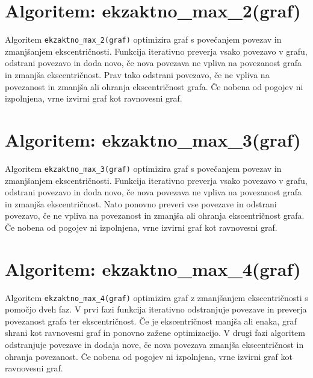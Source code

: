 \documentclass[fin1, tisk]{fmfdelo}
\begin{document}
\section{Algoritem: ekzaktno\_max\_2(graf)}

Algoritem \texttt{ekzaktno\_max\_2(graf)} optimizira graf s povečanjem povezav in zmanjšanjem ekscentričnosti.
Funkcija iterativno preverja vsako povezavo v grafu, odstrani povezavo in doda novo, če nova povezava ne vpliva
na povezanost grafa in zmanjša ekscentričnost. Prav tako odstrani povezavo, če ne vpliva na povezanost in zmanjša
ali ohranja ekscentričnost grafa. Če nobena od pogojev ni izpolnjena, vrne izvirni graf kot ravnovesni graf.

\section{Algoritem: ekzaktno\_max\_3(graf)}

Algoritem \texttt{ekzaktno\_max\_3(graf)} optimizira graf s povečanjem povezav in zmanjšanjem ekscentričnosti.
Funkcija iterativno preverja vsako povezavo v grafu, odstrani povezavo in doda novo, če nova povezava ne vpliva
na povezanost grafa in zmanjša ekscentričnost. Nato ponovno preveri vse povezave in odstrani povezavo,
če ne vpliva na povezanost in zmanjša ali ohranja ekscentričnost grafa. Če nobena od pogojev ni izpolnjena,
vrne izvirni graf kot ravnovesni graf.

\section{Algoritem: ekzaktno\_max\_4(graf)}

Algoritem \texttt{ekzaktno\_max\_4(graf)} optimizira graf z zmanjšanjem ekscentričnosti s pomočjo dveh faz.
V prvi fazi funkcija iterativno odstranjuje povezave in preverja povezanost grafa ter ekscentričnost.
Če je ekscentričnost manjša ali enaka, graf shrani kot ravnovesni graf in ponovno zažene optimizacijo.
V drugi fazi algoritem odstranjuje povezave in dodaja nove, če nova povezava zmanjša ekscentričnost in ohranja povezanost.
Če nobena od pogojev ni izpolnjena, vrne izvirni graf kot ravnovesni graf.
\end{document}
